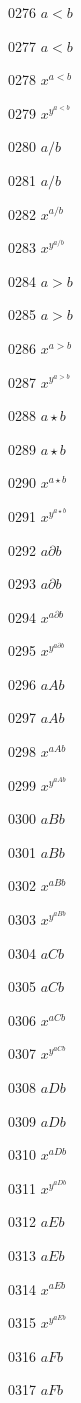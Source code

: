 \documentclass{article}
\begin{document}
0276 $a<b$\par
0277 $\displaystyle a<b$\par
0278 $x^{a<b}$\par
0279 $x^{y^{a<b}}$\par
0280 $a/b$\par
0281 $\displaystyle a/b$\par
0282 $x^{a/b}$\par
0283 $x^{y^{a/b}}$\par
0284 $a>b$\par
0285 $\displaystyle a>b$\par
0286 $x^{a>b}$\par
0287 $x^{y^{a>b}}$\par
0288 $a\star b$\par
0289 $\displaystyle a\star b$\par
0290 $x^{a\star b}$\par
0291 $x^{y^{a\star b}}$\par
0292 $a\partial b$\par
0293 $\displaystyle a\partial b$\par
0294 $x^{a\partial b}$\par
0295 $x^{y^{a\partial b}}$\par
0296 $aAb$\par
0297 $\displaystyle aAb$\par
0298 $x^{aAb}$\par
0299 $x^{y^{aAb}}$\par
0300 $aBb$\par
0301 $\displaystyle aBb$\par
0302 $x^{aBb}$\par
0303 $x^{y^{aBb}}$\par
0304 $aCb$\par
0305 $\displaystyle aCb$\par
0306 $x^{aCb}$\par
0307 $x^{y^{aCb}}$\par
0308 $aDb$\par
0309 $\displaystyle aDb$\par
0310 $x^{aDb}$\par
0311 $x^{y^{aDb}}$\par
0312 $aEb$\par
0313 $\displaystyle aEb$\par
0314 $x^{aEb}$\par
0315 $x^{y^{aEb}}$\par
0316 $aFb$\par
0317 $\displaystyle aFb$\par
\end{document}
